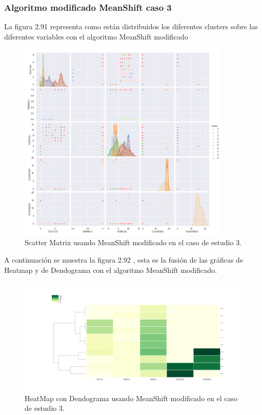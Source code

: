 	\subsubsection{Algoritmo modificado MeanShift caso 3}

	La figura 2.91 representa como están distribuidos los diferentes clusters sobre las diferentes variables con el 
	algoritmo MeanShift modificado\\

	\begin{figure}[htb]
		\centering
		\includegraphics[width=0.9\textwidth]{./imagenes/caso3/scatterMatrix_caso3_MeanShift_modificado}
		\caption{Scatter Matrix usando MeanShift modificado en el caso de estudio 3.} \label{fig:1}
	\end{figure}
	
	A continuación se muestra la figura 2.92 , esta es la fusión de las gráficas de 
	Heatmap y de Dendograma con el algoritmo MeanShift modificado.  \\

	\begin{figure}[htb]
		\centering
		\includegraphics[width=1.0\textwidth]{./imagenes/caso3/heatmapcondendograma_caso3_MeanShift_modificado}
		\caption{HeatMap con Dendograma usando MeanShift modificado en el caso de estudio 3.} \label{fig:1}
	\end{figure}

